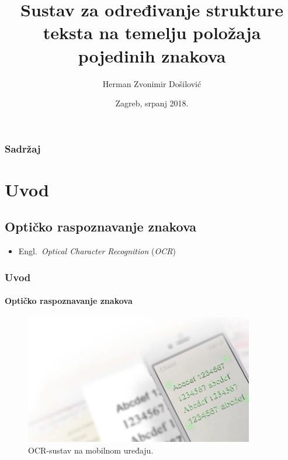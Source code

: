 \documentclass{beamer}
\title[Završni rad br. 5709]{Sustav za određivanje strukture teksta na temelju položaja pojedinih znakova}
\author{Herman Zvonimir Došilović}
\institute[FER]{Sveučilište u Zagrebu\\ Fakultet elektrotehnike i računarstva}
\date{Zagreb, srpanj 2018.}
\begin{document}
\frame{\titlepage}

\begin{frame}
\frametitle{Sadržaj}
\tableofcontents
\end{frame}

\section{Uvod}
\subsection{Optičko raspoznavanje znakova}
\begin{frame}
\begin{itemize}
    \item Engl.~\textit{Optical Character Recognition} (\textit{OCR})
\end{itemize}
\frametitle{Uvod}
\framesubtitle{Optičko raspoznavanje znakova}
\begin{figure}[htb]
    \centering
    \includegraphics[width=10cm]{images/mobile-ocr.jpg}
    \caption{OCR-sustav na mobilnom uređaju. \citep{Microblink}}
    \label{fig:mobile-ocr}
\end{figure}
\end{frame}
\end{document}
